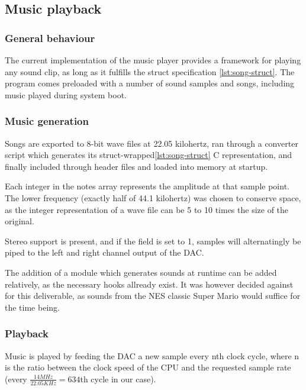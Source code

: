 \subsection{Music playback}

\subsubsection{General behaviour}

The current implementation of the music player provides a framework for playing any sound clip, as long as it fulfills the struct specification \ref{lst:song-struct}.
The program comes preloaded with a number of sound samples and songs, including music played during system boot.


\subsubsection{Music generation}

Songs are exported to 8-bit wave files at 22.05 kilohertz,
ran through a converter script which generates its struct-wrapped\ref{lst:song-struct} C
representation, and finally included through header files and loaded into memory at startup.



Each integer in the notes array represents the amplitude at that sample point.
The lower frequency (exactly half of 44.1 kilohertz) was chosen to conserve space, as the integer representation of a wave file can be 5 to 10 times the size of the original.

Stereo support is present, and if the field is set to 1, samples will alternatingly be piped to the left and right channel output of the DAC.

The addition of a module which generates sounds at runtime can be added relatively, as the necessary hooks allready exist. It was however decided against for this deliverable, as sounds from the NES classic Super Mario would suffice for the time being.

\subsubsection{Playback}

Music is played by feeding the DAC a new sample every nth clock cycle, where n is the ratio between the clock speed of the CPU and the requested sample rate (every $ \frac{14 MHz}{22.05 KHz} = 634 $th cycle in our case).


